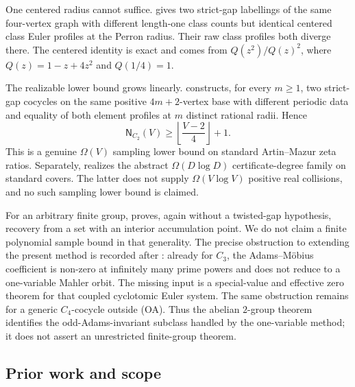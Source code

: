One centered radius cannot suffice.   gives
two strict-gap labellings of the same four-vertex graph with different
length-one class counts but identical centered class Euler profiles at the
Perron radius.  Their raw class profiles both diverge there.  The centered
identity is exact and comes from
\(Q(z^2)/Q(z)^2\), where \(Q(z)=1-z+4z^2\) and \(Q(1/4)=1\).

The realizable lower bound grows linearly.
 constructs, for every \(m\ge1\),
two strict-gap cocycles on the same positive \(4m+2\)-vertex base with
different periodic data and equality of both element profiles at \(m\)
distinct rational radii.  Hence
\[
 \mathsf N_{C_2}(V)\ge
 \left\lfloor\frac{V-2}{4}\right\rfloor+1.
\]
This is a genuine \(\Omega(V)\) sampling lower bound on standard
Artin--Mazur zeta ratios.  Separately,
 realizes the abstract
\(\Omega(D\log D)\) certificate-degree family on standard covers.  The latter
does not supply \(\Omega(V\log V)\) positive real collisions, and no such
sampling lower bound is claimed.

For an arbitrary finite group,  proves,
again without a twisted-gap hypothesis, recovery from a set with an interior
accumulation point.  We do not claim a
finite polynomial sample bound in that generality.  The precise obstruction
to extending the present method is recorded after
: already for \(C_3\), the
Adams--M\"obius coefficient is non-zero at infinitely many prime powers and
does not reduce to a one-variable Mahler orbit.  The missing input is a
special-value and effective zero theorem for that coupled cyclotomic Euler
system.  The same obstruction remains for a generic \(C_4\)-cocycle outside
(OA).  Thus the abelian \(2\)-group theorem identifies the odd-Adams-invariant
subclass handled by the one-variable method; it does not assert an unrestricted
finite-group theorem.

\subsection{Prior work and scope}

